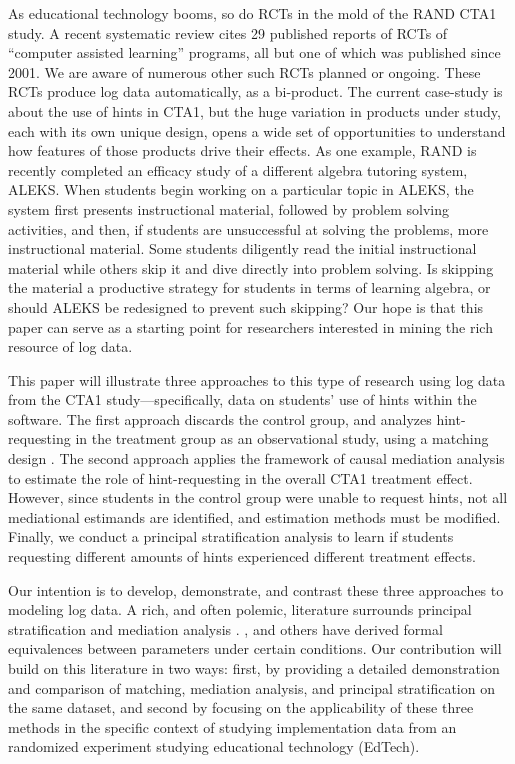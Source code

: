 \documentclass{article}\usepackage[]{graphicx}\usepackage[]{color}
\begin{document}
As educational technology booms, so do RCTs in the mold of the RAND
CTA1 study. A recent systematic review \citep{escueta2017education} cites 29
published reports of RCTs of ``computer assisted learning'' programs,
all but one of which was published since 2001. We are aware of
numerous other such RCTs planned or ongoing.
These RCTs produce log data automatically, as a bi-product.
The current case-study is
about the use of hints in CTA1, but the huge variation in products
under study, each with its own unique design, opens a wide set of opportunities to understand how features of those
products drive their effects. As one example, RAND is recently
completed an efficacy study of a different algebra tutoring system,
ALEKS. When students begin working on a particular topic in ALEKS, the
system first presents instructional material, followed by problem
solving activities, and then, if students are unsuccessful at solving
the problems, more instructional material. Some students diligently
read the initial instructional material while others skip it and dive
directly into problem solving. Is skipping the material a productive
strategy for students in terms of learning algebra, or should ALEKS be
redesigned to prevent such skipping? %
Our hope is that this paper can serve as a starting point
for researchers interested in mining the rich resource of log data.

This paper will illustrate three approaches to this type of research
using log data from the CTA1 study---specifically, data on students' use
of hints within the software.
The first approach discards the control group, and analyzes
hint-requesting in the treatment group as an observational study,
using a matching design
\citep[c.f.][]{rosenbaum2002observational}. The
second approach applies the framework of causal mediation analysis
\citep{vanderweele2015explanation,hong2015causality,imai2011unpacking} to estimate the role of
hint-requesting in the overall CTA1 treatment effect. However, since
students in the control group were unable to request hints, not all
mediational estimands are identified, and estimation methods must be
modified.
Finally, we conduct a principal stratification analysis
\citep{frangakis} to learn if students requesting different amounts of
hints experienced different treatment effects.

Our intention is to develop, demonstrate, and contrast these three
approaches to modeling log data.
A rich, and often polemic, literature surrounds principal
stratification and mediation analysis
\citep[e.g.][]{rubin2004direct,vanderweele2011principal,pearl2011principal,mealli2012refreshing,vanderweele2012comments}.
\citet{vanderweele2008simple}, \citet{jo2008causal} and others have
derived formal equivalences between parameters under certain
conditions.
Our contribution will build on this literature in two ways: first, by
providing a detailed demonstration and comparison of matching, mediation analysis,
and principal stratification on the same dataset, and second by
focusing on the applicability of these three methods in the specific
context of studying implementation data from an randomized
experiment studying educational technology (EdTech).
\end{document}
